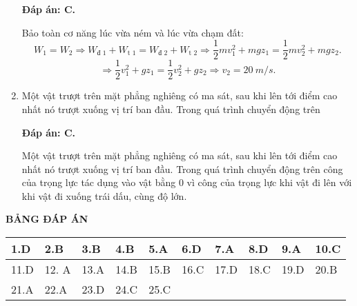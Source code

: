\begin{enumerate}[label=\bfseries Câu \arabic*:]
	\hideall
	{	
		\textbf{Đáp án: C.}
		
		Bảo toàn cơ năng lúc vừa ném và lúc vừa chạm đất:
		$$W_1 = W_2 \Rightarrow W_\text{đ 1} + W_\text{t 1} = W_\text{đ 2} + W_\text{t 2} \Rightarrow \dfrac{1}{2}mv_1^2 + mgz_1 = \dfrac{1}{2}mv_2^2 + mgz_2.$$
		$$\Rightarrow \dfrac{1}{2}v_1^2 + gz_1 = \dfrac{1}{2}v_2^2 + gz_2 \Rightarrow v_2 = \SI{20}{m/s}.$$
	}
	\item {}
	
	
	{
		Một vật trượt trên mặt phẳng nghiêng có ma sát, sau khi lên tới điểm cao nhất nó trượt xuống vị trí ban đầu. Trong quá trình chuyển động trên
	}
	
	\hideall
	{	
		\textbf{Đáp án: C.}
		
		Một vật trượt trên mặt phẳng nghiêng có ma sát, sau khi lên tới điểm cao nhất nó trượt xuống vị trí ban đầu. Trong quá trình chuyển động trên công của trọng lực tác dụng vào vật bằng 0 vì công của trọng lực khi vật đi lên với khi vật đi xuống trái dấu, cùng độ lớn.
	}
\end{enumerate}
\hideall
{
	\begin{center}
		\textbf{BẢNG ĐÁP ÁN}
	\end{center}
	\begin{center}
		\begin{tabular}{|m{2.8em}|m{2.8em}|m{2.8em}|m{2.8em}|m{2.8em}|m{2.8em}|m{2.8em}|m{2.8em}|m{2.8em}|m{2.8em}|}
			\hline
			1.D  & 2.B  & 3.B  & 4.B  & 5.A  & 6.D  & 7.A  & 8.D  & 9.A  & 10.C  \\
			\hline
			11.D  & 12. A  & 13.A  & 14.B  & 15.B  & 16.C  & 17.D  & 18.C  & 19.D  & 20.B  \\
			\hline
			21.A  & 22.A  & 23.D  & 24.C & 25.C  &   &   &   &   &  \\
			\hline
		\end{tabular}
	\end{center}
}